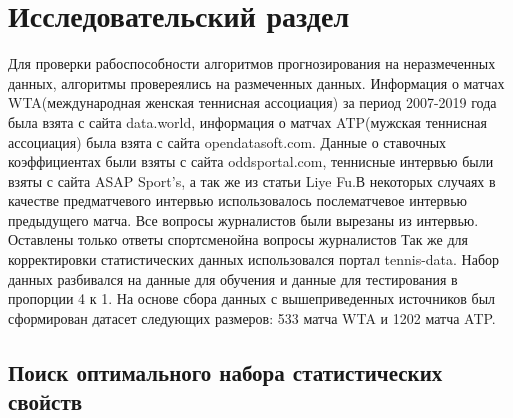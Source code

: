 \chapter{Исследовательский раздел}
Для проверки рабоспособности алгоритмов прогнозирования на неразмеченных данных, алгоритмы провереялись на размеченных данных.
Информация о матчах WTA(международная женская теннисная ассоциация) за период 2007-2019 года была взята с сайта data.world\cite{Book34}, информация о матчах ATP(мужская теннисная ассоциация) была взята с сайта opendatasoft.com\cite{Book35}.
Данные о ставочных коэффициентах были взяты с сайта oddsportal.com\cite{Book36}, теннисные интервью были взяты с сайта  ASAP
Sport’s\cite{Book37}, а так же из статьи Liye Fu\cite{Book38}.В некоторых случаях в качестве предматчевого интервью использовалось послематчевое интервью предыдущего матча. Все вопросы журналистов были вырезаны из интервью. Оставлены только ответы спортсменойна вопросы журналистов Так же для корректировки статистических данных использовался портал tennis-data\cite{Book39}. Набор данных разбивался на данные для обучения и данные для тестирования в пропорции 4 к 1.
На основе сбора данных с вышеприведенных источников был сформирован датасет следующих размеров: 533 матча WTA и 1202 матча ATP.
\section{Поиск оптимального набора статистических свойств}

